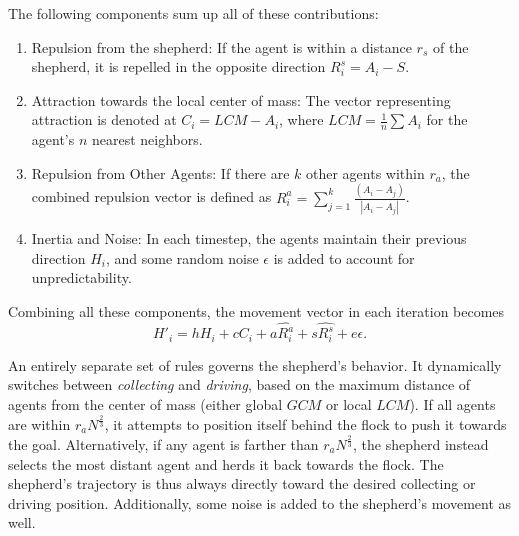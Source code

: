 \documentclass[9pt]{pnas-new}
\begin{document}
The following components sum up all of these contributions:
\begin{enumerate}
    \item Repulsion from the shepherd:
    If the agent is within a distance $r_s$ of the shepherd, it is repelled in the opposite direction $R^s_i = A_i - S$.
    
    \item Attraction towards the local center of mass:
    The vector representing attraction is denoted at $C_i = LCM - A_i$, where $LCM = \frac{1}{n}\sum A_i$ for the agent's $n$ nearest neighbors.
    
    \item Repulsion from Other Agents:
    If there are $k$ other agents within $r_a$, the combined repulsion vector is defined as $R^a_i = \sum^k_{j=1} \frac{(A_i - A_j)}{|A_i - A_j|}$.
    
    \item Inertia and Noise:
    In each timestep, the agents maintain their previous direction $H_i$, and some random noise $\epsilon$ is added to account for unpredictability.
\end{enumerate}
Combining all these components, the movement vector in each iteration becomes $$H'_i = h H_i + c C_i + a \hat{R_i^a} + s \hat{R_i^s} + e \epsilon.$$

An entirely separate set of rules governs the shepherd's behavior. It dynamically switches between \textit{collecting} and \textit{driving}, based on the maximum distance of agents from the center of mass (either global $GCM$ or local $LCM$). If all agents are within $r_aN^\frac{2}{3}$, it attempts to position itself behind the flock to push it towards the goal. Alternatively, if any agent is farther than $r_aN^{\frac{2}{3}}$, the shepherd instead selects the most distant agent and herds it back towards the flock. The shepherd's trajectory is thus always directly toward the desired collecting or driving position. Additionally, some noise is added to the shepherd's movement as well.
\end{document}
